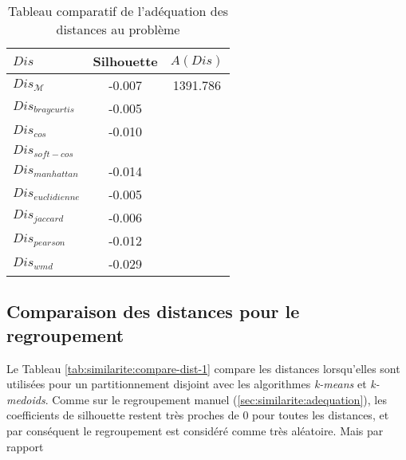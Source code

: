 \begin{table}[!htb]
	\centering \scriptsize
  \begin{tabular}{|l|c|c|}
  	\hline
	$Dis$ & Silhouette &  $A(Dis)$ \\ \hline
	$Dis_\mathcal{M}$ &-0.007& 1391.786 \\ \hline
	$Dis_{braycurtis}$ &-0.005& \\ \hline
	$Dis_{cos}$ &-0.010& \\ \hline
	$Dis_{soft-cos}$ && \\ \hline
	$Dis_{manhattan}$ &-0.014& \\ \hline
	$Dis_{euclidienne}$ &-0.005&  \\ \hline
	$Dis_{jaccard}$ &-0.006&  \\ \hline
	$Dis_{pearson}$ &-0.012& \\ \hline
	$Dis_{wmd}$ &-0.029& \\ \hline	
  \end{tabular}
	\caption{Tableau comparatif de l'adéquation des distances au problème} \label{tab:similarite:compare-dist-adequation}
\end{table}

\subsection{Comparaison des distances pour le regroupement}


Le Tableau \ref{tab:similarite:compare-dist-1} compare les distances lorsqu'elles sont utilisées pour un partitionnement disjoint avec les algorithmes \textit{k-means} et \textit{k-medoids}. Comme sur le regroupement manuel (\ref{sec:similarite:adequation}), les coefficients de silhouette restent très proches de 0 pour toutes les distances, et  par conséquent le regroupement est considéré comme très aléatoire. Mais par rapport

